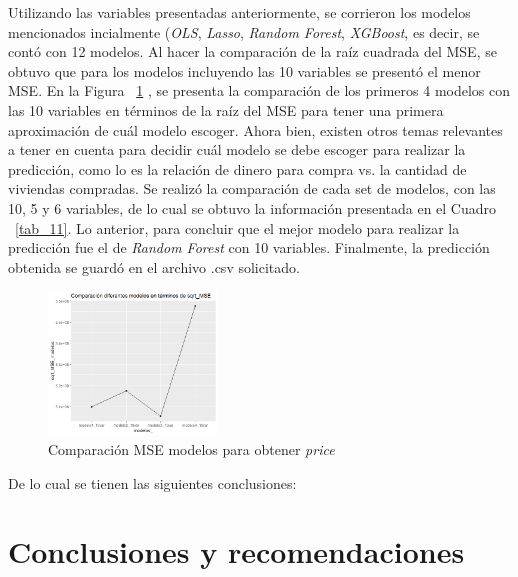 \documentclass[conference, 10pt]{IEEEtran}
\begin{document}
Utilizando las variables presentadas anteriormente, se corrieron los modelos mencionados incialmente (\textit{OLS}, \textit{Lasso}, \textit{Random Forest}, \textit{XGBoost}, es decir, se contó con 12 modelos. Al hacer la comparación de la raíz cuadrada del MSE, se obtuvo que para los modelos incluyendo las 10 variables se presentó el menor MSE. En la Figura ~\ref{fig_3} , se presenta la comparación de los primeros 4 modelos con las 10 variables en términos de la raíz del MSE para tener una primera aproximación de cuál modelo escoger. Ahora bien, existen otros temas relevantes a tener en cuenta para decidir cuál modelo se debe escoger para realizar la predicción, como lo es la relación de dinero para compra vs. la cantidad de viviendas compradas. Se realizó la comparación de cada set de modelos, con las 10, 5 y 6 variables, de lo cual se obtuvo la información presentada en el Cuadro ~\ref{tab_11}. Lo anterior, para concluir que el mejor modelo para realizar la predicción fue el de \textit{Random Forest} con 10 variables. Finalmente, la predicción obtenida se guardó en el archivo .csv solicitado.
\\

\begin{figure}[htbp]
\centerline{\includegraphics[width=0.4\textwidth]{../Vistas/Comp_MSE_modelos_var_10.png}}
\caption{Comparación MSE modelos para obtener \textit{price}}
\label{fig_3}
\end{figure}


De lo cual se tienen las siguientes conclusiones:



\section{Conclusiones y recomendaciones}
\end{document}

